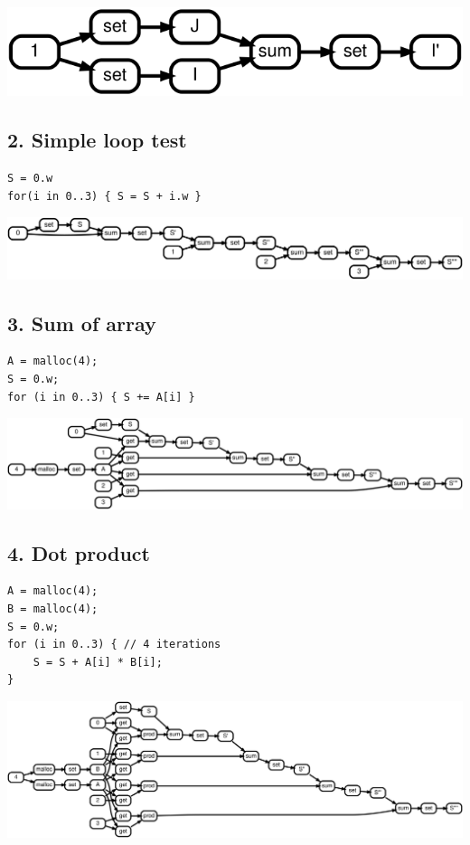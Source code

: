 \documentclass[sigplan,10pt,review,anonymous]{acmart}
\begin{document}
\includegraphics[scale=0.1]{rtd41}

\subsection*{2. Simple loop test}

\begin{lstlisting}
S = 0.w
for(i in 0..3) { S = S + i.w }
\end{lstlisting}

\includegraphics[scale=0.1]{rtd42}

\subsection*{3. Sum of array}

\begin{lstlisting}
A = malloc(4);
S = 0.w;
for (i in 0..3) { S += A[i] }
\end{lstlisting}

\includegraphics[scale=0.1]{rtd43}

\subsection*{4. Dot product}

\begin{lstlisting}
A = malloc(4);
B = malloc(4);
S = 0.w;
for (i in 0..3) { // 4 iterations
    S = S + A[i] * B[i];
}
\end{lstlisting}

\includegraphics[scale=0.1]{rtd44}
\end{document}
